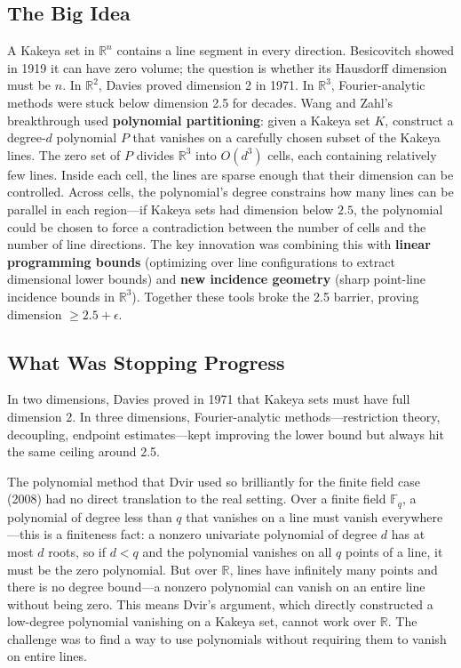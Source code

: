 \subsection{The Big Idea}
A Kakeya set in $\mathbb{R}^n$ contains a line segment in every direction. Besicovitch showed in 1919 it can have zero volume; the question is whether its Hausdorff dimension must be $n$. In $\mathbb{R}^2$, Davies proved dimension 2 in 1971. In $\mathbb{R}^3$, Fourier-analytic methods were stuck below dimension 2.5 for decades. Wang and Zahl's breakthrough used \textbf{polynomial partitioning}: given a Kakeya set $K$, construct a degree-$d$ polynomial $P$ that vanishes on a carefully chosen subset of the Kakeya lines. The zero set of $P$ divides $\mathbb{R}^3$ into $O(d^3)$ cells, each containing relatively few lines. Inside each cell, the lines are sparse enough that their dimension can be controlled. Across cells, the polynomial's degree constrains how many lines can be parallel in each region---if Kakeya sets had dimension below $2.5$, the polynomial could be chosen to force a contradiction between the number of cells and the number of line directions. The key innovation was combining this with \textbf{linear programming bounds} (optimizing over line configurations to extract dimensional lower bounds) and \textbf{new incidence geometry} (sharp point-line incidence bounds in $\mathbb{R}^3$). Together these tools broke the 2.5 barrier, proving dimension $\geq 2.5 + \epsilon$.

\subsection{What Was Stopping Progress}
In two dimensions, Davies proved in 1971 that Kakeya sets must have full dimension 2. In three dimensions, Fourier-analytic methods---restriction theory, decoupling, endpoint estimates---kept improving the lower bound but always hit the same ceiling around 2.5.

The polynomial method that Dvir used so brilliantly for the finite field case (2008) had no direct translation to the real setting. Over a finite field $\mathbb{F}_q$, a polynomial of degree less than $q$ that vanishes on a line must vanish everywhere---this is a finiteness fact: a nonzero univariate polynomial of degree $d$ has at most $d$ roots, so if $d < q$ and the polynomial vanishes on all $q$ points of a line, it must be the zero polynomial. But over $\mathbb{R}$, lines have infinitely many points and there is no degree bound---a nonzero polynomial can vanish on an entire line without being zero. This means Dvir's argument, which directly constructed a low-degree polynomial vanishing on a Kakeya set, cannot work over $\mathbb{R}$. The challenge was to find a way to use polynomials without requiring them to vanish on entire lines.

